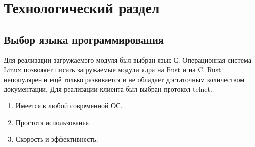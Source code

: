 \chapter{Технологический раздел}
\section{Выбор  языка программирования}
Для реализации загружаемого модуля был выбран язык С. 
Операционная система Linux позволяет писать загружаемые модули ядра на Rust и на C. 
Rust непопулярен и ещё только развивается и не обладает достаточным количеством документации.
Для реализации клиента был выбран протокол telnet.
\begin{enumerate}
	 \item Имеется в любой современной ОС. 
	 \item Простота использования.
	 \item Скорость и эффективность.
\end{enumerate}




